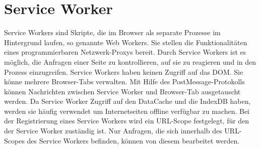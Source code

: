 \section{Service Worker}
Service Workers sind Skripte, die im Browser als separate Prozesse im Hintergrund laufen, so genannte Web Workers. Sie stellen die Funktionalitäten eines programmierbaren Netzwerk-Proxys bereit. Durch Service Workers ist es möglich, die Anfragen einer Seite zu kontrollieren, auf sie zu reagieren und in den Prozess einzugreifen.\cite{w3ServiceWorker} Service Workers haben keinen Zugriff auf das DOM. Sie könne mehrere Browser-Tabs verwalten. Mit Hilfe des PostMessage-Protokolls können Nachrichten zwischen Service Worker und Browser-Tab ausgetauscht werden. Da Service Worker Zugriff auf den DataCache und die IndexDB haben, werden sie häufig verwendet um Internetseiten offline verfügbar zu machen. Bei der Registrierung eines Service Workers wird ein URL-Scope festgelegt, für den der Service Worker zuständig ist. Nur Anfragen, die sich innerhalb des URL-Scopes des Service Workers befinden, können von diesem bearbeitet werden.


